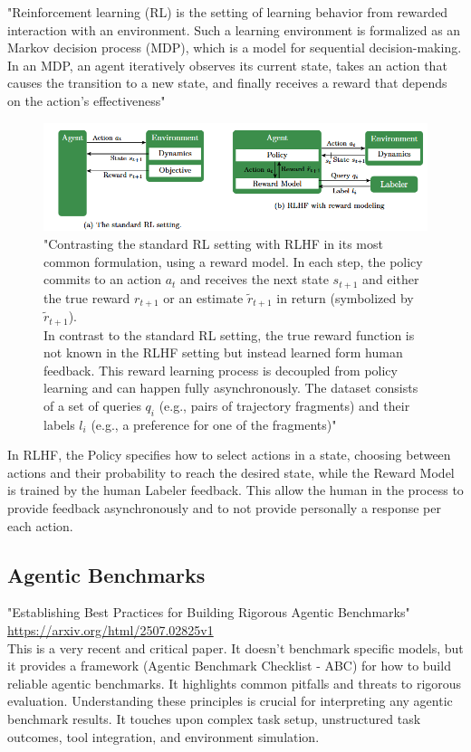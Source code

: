 \documentclass[12pt]{article}
\begin{document}
"Reinforcement learning (RL)\cite{ReinforcementLearningAnIntroduction} is the setting of learning behavior from rewarded interaction with an environment. Such a learning environment is formalized as an Markov decision process (MDP), which is a model for sequential decision-making. In an MDP, an agent iteratively observes its current state, takes an action that causes the transition to a new state, and finally receives a reward that depends on the action’s effectiveness"\cite{kaufmann2024surveyreinforcementlearninghuman}
    \begin{figure}[H]
    \centering
            \includegraphics[width=1\textwidth]{RL_and_RLHF.png}
    \caption{"Contrasting the standard RL setting with RLHF in its most common formulation, using a reward model. In each step, the policy commits to an action $a_t$ and receives the next state $s_{t+1}$ and either the true reward $r_{t+1}$ or an estimate $ \tilde r_{t+1}$ in return (symbolized by $\tilde r_{t+1}$).\\ In contrast to the standard RL setting, the true reward function is not known in the RLHF setting but instead learned form human feedback. This reward learning process is decoupled from policy learning and can happen fully asynchronously. The dataset consists of a set of queries $q_i$ (e.g., pairs of trajectory fragments) and their labels $l_i$ (e.g., a preference for one of the fragments)"\cite{kaufmann2024surveyreinforcementlearninghuman}}
    \end{figure}
\noindent In RLHF, the Policy specifies how to select actions in a state, choosing between actions and their probability to reach the desired state, while the Reward Model is trained by the human Labeler feedback. This allow the human in the process to provide feedback asynchronously and to not provide personally a response per each action.\cite{kaufmann2024surveyreinforcementlearninghuman}\\

	\subsection{Agentic Benchmarks}
"Establishing Best Practices for Building Rigorous Agentic Benchmarks"\\
\url{https://arxiv.org/html/2507.02825v1}\\
This is a very recent and critical paper. It doesn't benchmark specific models, but it provides a framework (Agentic Benchmark Checklist - ABC) for how to build reliable agentic benchmarks. It highlights common pitfalls and threats to rigorous evaluation. Understanding these principles is crucial for interpreting any agentic benchmark results. It touches upon complex task setup, unstructured task outcomes, tool integration, and environment simulation.
\end{document}
